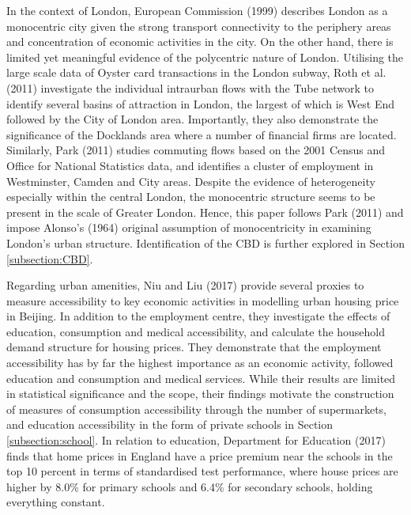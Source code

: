 \documentclass{article}
\begin{document}
In the context of London, European Commission (1999) describes London as a monocentric city given the strong transport connectivity to the periphery areas and concentration of economic activities in the city. On the other hand, there is limited yet meaningful evidence of the polycentric nature of London. Utilising the large scale data of Oyster card transactions in the London subway, Roth et al. (2011) investigate the individual intraurban flows with the Tube network to identify several basins of attraction in London, the largest of which is West End followed by the City of London area. Importantly, they also demonstrate the significance of the Docklands area where a number of financial firms are located. Similarly, Park (2011) studies commuting flows based on the 2001 Census and Office for National Statistics data, and identifies a cluster of employment in Westminster, Camden and City areas. Despite the evidence of heterogeneity especially within the central London, the monocentric structure seems to be present in the scale of Greater London. Hence, this paper follows Park (2011) and impose Alonso's (1964) original assumption of monocentricity in examining London's urban structure. Identification of the CBD is further explored in Section \ref{subsection:CBD}.

Regarding urban amenities, Niu and Liu (2017) provide several proxies to measure accessibility to key economic activities in modelling urban housing price in Beijing. In addition to the employment centre, they investigate the effects of education, consumption and medical accessibility, and calculate the household demand structure for housing prices. They demonstrate that the employment accessibility has by far the highest importance as an economic activity, followed education and consumption and medical services. While their results are limited in statistical significance and the scope, their findings motivate the construction of measures of consumption accessibility through the number of supermarkets, and education accessibility in the form of private schools in Section \ref{subsection:school}. In relation to education, Department for Education (2017) finds that home prices in England have a price premium near the schools in the top 10 percent in terms of standardised test performance, where house prices are higher by 8.0\% for primary schools and 6.4\% for secondary schools, holding everything constant.
\end{document}
